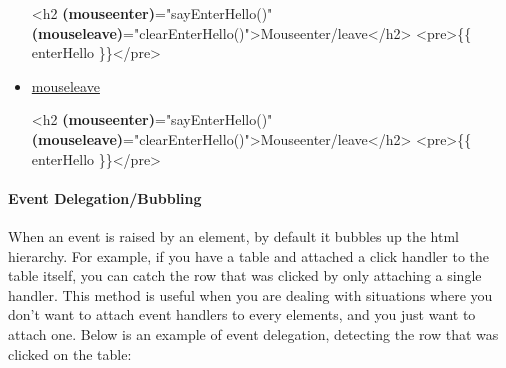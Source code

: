 \documentclass[12pt,]{article}
\newenvironment{Shaded}{}{}
\newcommand{\KeywordTok}[1]{\textcolor[rgb]{0.00,0.00,1.00}{{#1}}}
\newcommand{\StringTok}[1]{\textcolor[rgb]{0.00,0.50,0.50}{{#1}}}
\newcommand{\OtherTok}[1]{\textcolor[rgb]{1.00,0.25,0.00}{{#1}}}
\newcommand{\ErrorTok}[1]{\textcolor[rgb]{1.00,0.00,0.00}{\textbf{{#1}}}}
\newcommand{\NormalTok}[1]{{#1}}
\let\oldparagraph\paragraph
\renewcommand{\paragraph}[1]{\oldparagraph{#1}\mbox{}}
\begin{document}
\begin{itemize}
\begin{Shaded}
\begin{Highlighting}[numbers=left,,]
\KeywordTok{<h2} \ErrorTok{(mouseenter)}\OtherTok{=}\StringTok{"sayEnterHello()"} \ErrorTok{(mouseleave)}\OtherTok{=}\StringTok{"clearEnterHello()"}\KeywordTok{>}\NormalTok{Mouseenter/leave}\KeywordTok{</h2>}
\KeywordTok{<pre>}\NormalTok{\{\{ enterHello \}\}}\KeywordTok{</pre>}
\end{Highlighting}
\end{Shaded}
\item
  \href{https://developer.mozilla.org/en-US/docs/Web/Events/mouseleave}{mouseleave}

\begin{Shaded}
\begin{Highlighting}[numbers=left,,]
\KeywordTok{<h2} \ErrorTok{(mouseenter)}\OtherTok{=}\StringTok{"sayEnterHello()"} \ErrorTok{(mouseleave)}\OtherTok{=}\StringTok{"clearEnterHello()"}\KeywordTok{>}\NormalTok{Mouseenter/leave}\KeywordTok{</h2>}
\KeywordTok{<pre>}\NormalTok{\{\{ enterHello \}\}}\KeywordTok{</pre>}
\end{Highlighting}
\end{Shaded}
\end{itemize}

\paragraph{Event Delegation/Bubbling}\label{event-delegationbubbling}

When an event is raised by an element, by default it bubbles up the html
hierarchy. For example, if you have a table and attached a click handler
to the table itself, you can catch the row that was clicked by only
attaching a single handler. This method is useful when you are dealing
with situations where you don't want to attach event handlers to every
elements, and you just want to attach one. Below is an example of event
delegation, detecting the row that was clicked on the table:

\begin{Shaded}
\end{Shaded}
\end{document}
